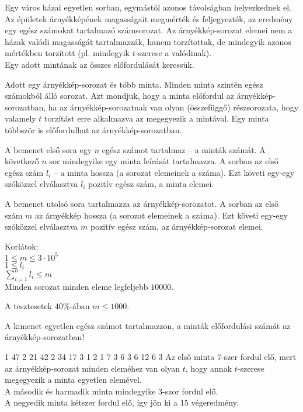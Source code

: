 




Egy város házai egyetlen sorban, egymástól azonos távolságban helyezkednek el.
Az épületek árnyékképének magasságait megmérték és feljegyezték, az eredmény egy egész számokat tartalmazó számsorozat.
Az árnyékkép-sorozat elemei nem a házak valódi magasságát tartalmazzák, hanem torzítottak, de mindegyik azonos mértékben torzított (pl. mindegyik $t$-szerese a valódinak).\\
Egy adott mintának az összes előfordulását keressük.


Adott egy árnyékkép-sorozat és több minta. Minden minta szintén egész számokból álló sorozat.
Azt mondjuk, hogy a minta előfordul az árnyékkép-sorozatban, ha az árnyékkép-sorozatnak van olyan (összefüggő) részsorozata, hogy valamely $t$ torzítást erre alkalmazva az megegyezik a mintával.
Egy minta többször is előfordulhat az árnyékkép-sorozatban.



A bemenet első sora egy $n$ egész számot tartalmaz -- a minták számát.
A következő $n$ sor mindegyike egy minta leírását tartalmazza. A sorban az első egész szám $l_i$ -- a minta hossza (a sorozat elemeinek a száma). Ezt követi egy-egy szóközzel elválasztva $l_i$ pozitív egész szám, a minta elemei.

A bemenet utolsó sora tartalmazza az árnyékkép-sorozatot. A sorban az első szám $m$ az árnyékkép hossza (a sorozat elemeinek a száma). Ezt követi egy-egy szóközzel elválasztva $m$ pozitív egész szám, az árnyékkép-sorozat elemei.

\bigskip

\noindent Korlátok:\\
$1 \leq m \leq 3\cdot10^5$\\
$1 \leq l_i$\\
$\sum^{n}_{i=1} l_i \leq m$\\
Minden sorozat minden eleme legfeljebb $10000$.

\smallskip

A tesztesetek $40\%$-ában $m \leq 1000$.


A kimenet egyetlen egész számot tartalmazzon, a minták előfordulási számát az árnyékkép-sorozatban!


1 47
2 21 42
2 34 17
3 1 2 1
7 3 6 3 6 12 6 3
\sampleCOMMENT
Az első minta 7-szer fordul elő, mert az árnyékkép-sorozat minden eleméhez van olyan $t$, hogy annak $t$-szerese megegyezik a minta egyetlen elemével.\\
A második és harmadik minta mindegyike 3-szor fordul elő.\\
A negyedik minta kétszer fordul elő, így jön ki a 15 végeredmény.
\sampleEND


 